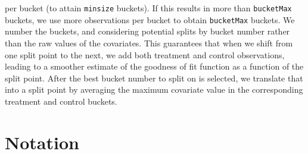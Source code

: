 \documentclass[11pt]{article}
\begin{document}
per bucket (to attain \texttt{minsize} buckets). If this results in more than \texttt{bucketMax} buckets, we use more observations per bucket to obtain \texttt{bucketMax} buckets.
We number the buckets, and considering potential splits by bucket number rather than the raw
values of the covariates.  This guarantees that when we shift from one split point to the next, we add both treatment and
control observations, leading to a smoother estimate of the goodness of fit function as a function of the split point.  After the
best bucket number to split on is selected, we translate that into a split point by averaging the maximum covariate value in
the corresponding treatment and control buckets.  


\section{Notation}
\end{document}
